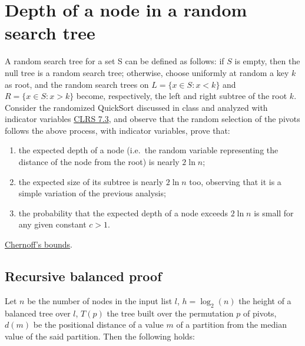 \documentclass{article}
\begin{document}
\newpage
\section{Depth of a node in a random search tree}

A random search tree for a set S can be defined as follows: if $S$ is empty, then
the null tree is a random search tree; otherwise, choose uniformly at random a key
$k$ as root, and the random search trees on $L = \{x \in S : x < k\}$ and $R = \{x \in S :
x > k\}$ become, respectively, the left and right subtree of the root $k$.
Consider the randomized QuickSort discussed in class and analyzed with indicator
variables \href{http://didawiki.cli.di.unipi.it/lib/exe/fetch.php/magistraleinformatica/alg2/algo2_13/randqs.pdf}{CLRS 7.3},
and observe that the random selection of the pivots follows the above process,
with indicator variables, prove that:
\begin{enumerate}
  \item the expected depth of a node (i.e.\ the random variable representing the distance of the node from the root) is nearly $2 \ln n$;
  \item the expected size of its subtree is nearly $2 \ln n$ too, observing that it is a simple variation of the previous analysis;
  \item the probability that the expected depth of a node exceeds $2\ln n$ is small for any given constant $c > 1$.
\end{enumerate}
\href{https://en.wikipedia.org/wiki/Chernoff_bound}{Chernoff’s bounds}.

\subsection{Recursive balanced proof}

Let $n$ be the number of nodes in the input list $l$, $h = \log_2(n)$ the height
of a balanced tree over $l$, $T(p)$ the tree built over the permutation $p$ of pivots,
$d(m)$ be the positional distance of a value $m$ of a partition from the median
value of the said partition.
Then the following holds:
\end{document}
